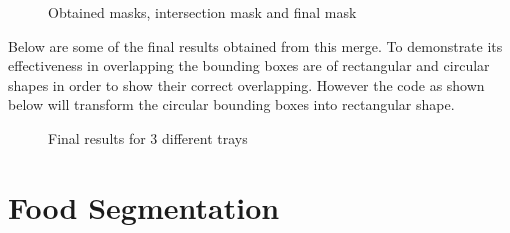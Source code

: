 \documentclass[
	a4paper, %
	10pt, %
	unnumberedsections, %
	twoside, %
]{LTJournalArticle}
\begin{document}
\begin{figure}[t]
\centering
    \caption{Obtained masks, intersection mask and final mask}
    \label{fig:mask}
\end{figure}

Below are some of the final results obtained from this merge. To demonstrate its effectiveness in overlapping the bounding boxes are of rectangular and circular shapes in order to show their correct overlapping. However the code as shown below will transform the circular bounding boxes into rectangular shape.

\begin{figure}[t]
    \centering
    \caption{Final results for 3 different trays}
    \label{fig:FinalMergeBBox}
\end{figure}

\section{Food Segmentation}
\end{document}
